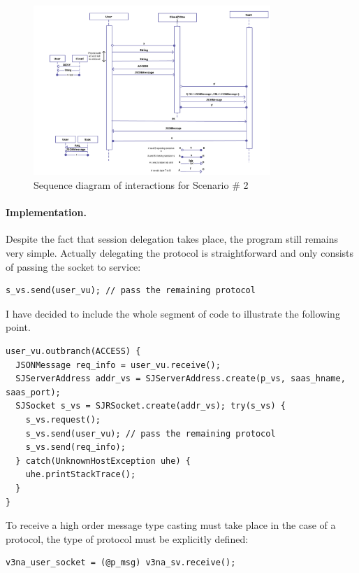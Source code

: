 \documentclass{llncs}
\begin{document}
\begin{figure}
\label{fig:seq-diagram-sc2}
\centering
\includegraphics[width=0.8\textwidth]{resources/interaction-sc2.png}
\caption{Sequence diagram of interactions for Scenario \# 2}
\label{fig:}
\end{figure}

\paragraph{Implementation.} Despite the fact that session delegation takes place, the program still remains very simple. Actually delegating the protocol is straightforward and only consists of passing the socket to service:

\begin{lstlisting}
s_vs.send(user_vu); // pass the remaining protocol
\end{lstlisting}

I have decided to include the whole segment of code to illustrate the following point. 

\begin{lstlisting}
user_vu.outbranch(ACCESS) {
  JSONMessage req_info = user_vu.receive();
  SJServerAddress addr_vs = SJServerAddress.create(p_vs, saas_hname, saas_port);
  SJSocket s_vs = SJRSocket.create(addr_vs); try(s_vs) {
    s_vs.request();
    s_vs.send(user_vu); // pass the remaining protocol    
    s_vs.send(req_info);
  } catch(UnknownHostException uhe) {
    uhe.printStackTrace(); 
  }
}
\end{lstlisting}

To receive a high order message type casting must take place in the case of a protocol, the type of protocol must be explicitly defined:

\begin{lstlisting}
v3na_user_socket = (@p_msg) v3na_sv.receive();
\end{lstlisting}
\end{document}
